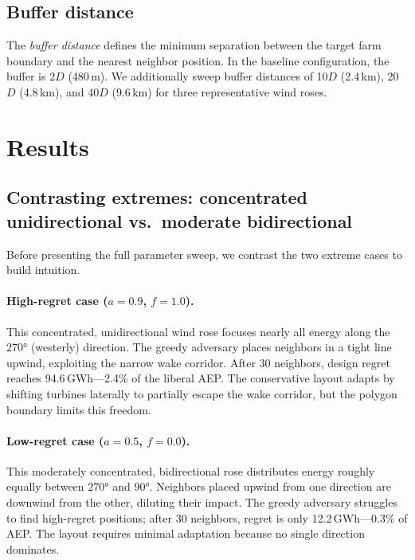 \documentclass[manuscript, 12pt]{copernicus}
\begin{document}
\subsection{Buffer distance}

The \emph{buffer distance} defines the minimum separation between the target farm boundary and the nearest neighbor position.
In the baseline configuration, the buffer is 2$D$ (480\,m).
We additionally sweep buffer distances of 10$D$ (2.4\,km), 20$D$ (4.8\,km), and 40$D$ (9.6\,km) for three representative wind roses.

\section{Results}\label{sec:results}

\subsection{Contrasting extremes: concentrated unidirectional vs.\ moderate bidirectional}

Before presenting the full parameter sweep, we contrast the two extreme cases to build intuition.

\paragraph{High-regret case ($a = 0.9$, $f = 1.0$).}
This concentrated, unidirectional wind rose focuses nearly all energy along the $270°$ (westerly) direction.
The greedy adversary places neighbors in a tight line upwind, exploiting the narrow wake corridor.
After 30 neighbors, design regret reaches 94.6\,GWh---2.4\% of the liberal AEP.
The conservative layout adapts by shifting turbines laterally to partially escape the wake corridor, but the polygon boundary limits this freedom.

\paragraph{Low-regret case ($a = 0.5$, $f = 0.0$).}
This moderately concentrated, bidirectional rose distributes energy roughly equally between $270°$ and $90°$.
Neighbors placed upwind from one direction are downwind from the other, diluting their impact.
The greedy adversary struggles to find high-regret positions; after 30 neighbors, regret is only 12.2\,GWh---0.3\% of AEP.
The layout requires minimal adaptation because no single direction dominates.
\end{document}
